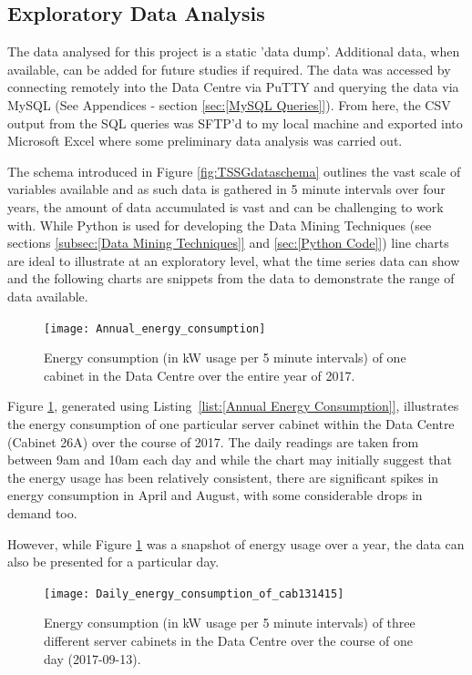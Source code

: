 \documentclass[12pt]{scrartcl}
\begin{document}
\subsection{Exploratory Data Analysis}
\label{subsec:[Exploratory Data Analysis]}
The data analysed for this project is a static 'data dump'. Additional data, when available, can be added for future studies if required. The data was accessed by connecting remotely into the Data Centre via PuTTY and querying the data via MySQL (See Appendices - section \ref{sec:[MySQL Queries]}). From here, the CSV output from the SQL queries was SFTP'd to my local machine and exported into Microsoft Excel where some preliminary data analysis was carried out. 

The schema introduced in Figure \ref{fig:TSSGdataschema} outlines the vast scale of variables available and as such data is gathered in 5 minute intervals over four years, the amount of data accumulated is vast and can be challenging to work with. While Python is used for developing the Data Mining Techniques (see sections \ref{subsec:[Data Mining Techniques]} and \ref{sec:[Python Code]}) line charts are ideal to illustrate at an exploratory level, what the time series data can show and the following charts are snippets from the data to demonstrate the range of data available.

\begin{figure}[H]
  \caption{Energy consumption (in kW usage per 5 minute intervals) of one cabinet in the Data Centre over the entire year of 2017.}
  \label{fig:Annualenergyfigure}
  \centering
    \texttt{[image: Annual\_energy\_consumption]}
\end{figure}

Figure \ref{fig:Annualenergyfigure}, generated using Listing~\ref{list:[Annual Energy Consumption]}, illustrates the energy consumption of one particular server cabinet within the Data Centre (Cabinet 26A) over the course of 2017. The daily readings are taken from between 9am and 10am each day and while the chart may initially suggest that the energy usage has been relatively consistent, there are significant spikes in energy consumption in April and August, with some considerable drops in demand too. 

However, while Figure \ref{fig:Annualenergyfigure} was a snapshot of energy usage over a year, the data can also be presented for a particular day. 

\begin{figure}[H]
  \caption{Energy consumption (in kW usage per 5 minute intervals) of three different server cabinets in the Data Centre over the course of one day (2017-09-13).}
  \label{fig:Dailyenergyfigure}
  \centering
    \texttt{[image: Daily\_energy\_consumption\_of\_cab131415]}
\end{figure}
   
\end{document}
